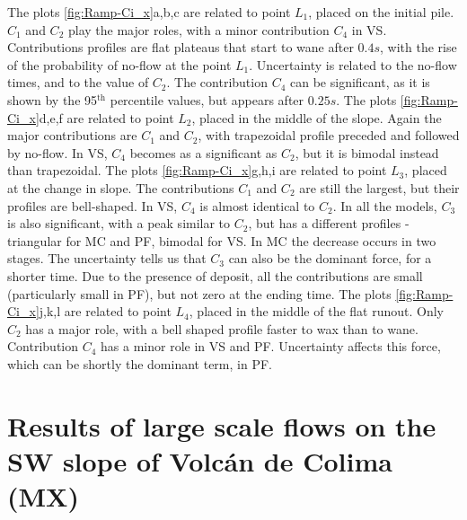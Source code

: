 \documentclass{article}
\begin{document}
The plots \ref{fig:Ramp-Ci_x}a,b,c are related to point $L_1$, placed on the initial pile. $C_1$ and $C_2$ play the major roles, with a minor contribution $C_4$ in VS. Contributions profiles are flat plateaus that start to wane after $0.4 s$, with the rise of the probability of no-flow at the point $L_1$. Uncertainty is related to the no-flow times, and to the value of $C_2$. The contribution $C_4$ can be significant, as it is shown by the 95$^{\mathrm{th}}$ percentile values, but appears after $0.25 s$. The plots \ref{fig:Ramp-Ci_x}d,e,f are related to point $L_2$, placed in the middle of the slope. Again the major contributions are $C_1$ and $C_2$, with trapezoidal profile preceded and followed by no-flow. In VS, $C_4$ becomes as a significant as $C_2$, but it is bimodal instead than trapezoidal. The plots \ref{fig:Ramp-Ci_x}g,h,i are related to point $L_3$, placed at the change in slope. The contributions $C_1$ and $C_2$ are still the largest, but their profiles are bell-shaped. In VS, $C_4$ is almost identical to $C_2$. In all the models, $C_3$ is also significant, with a peak similar to $C_2$, but has a different profiles - triangular for MC and PF, bimodal for VS. In MC the decrease occurs in two stages. The uncertainty tells us that $C_3$ can also be the dominant force, for a shorter time. Due to the presence of deposit, all the contributions are small (particularly small in PF), but not zero at the ending time. The plots \ref{fig:Ramp-Ci_x}j,k,l are related to point $L_4$, placed in the middle of the flat runout. Only $C_2$ has a major role, with a bell shaped profile faster to wax than to wane. Contribution $C_4$ has a minor role in VS and PF. Uncertainty affects this force, which can be shortly the dominant term, in PF.


\section{Results of large scale flows on the SW slope of Volc{\'a}n de Colima (MX)}
\end{document}
